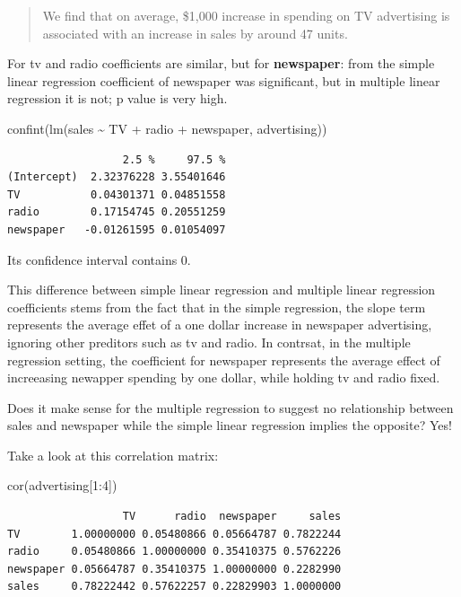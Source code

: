 \documentclass[
  letterpaper,
  DIV=11,
  numbers=noendperiod]{scrreprt}
\newenvironment{Shaded}{\begin{snugshade}}{\end{snugshade}}
\newcommand{\DecValTok}[1]{\textcolor[rgb]{0.68,0.00,0.00}{#1}}
\newcommand{\FunctionTok}[1]{\textcolor[rgb]{0.28,0.35,0.67}{#1}}
\newcommand{\NormalTok}[1]{\textcolor[rgb]{0.00,0.23,0.31}{#1}}
\newcommand{\SpecialCharTok}[1]{\textcolor[rgb]{0.37,0.37,0.37}{#1}}
\begin{document}
\begin{quote}
We find that on average, \$1,000 increase in spending on TV advertising
is associated with an increase in sales by around 47 units.
\end{quote}

For tv and radio coefficients are similar, but for \textbf{newspaper}:
from the simple linear regression coefficient of newspaper was
significant, but in multiple linear regression it is not; p value is
very high.

\begin{Shaded}
\begin{Highlighting}[]
\FunctionTok{confint}\NormalTok{(}\FunctionTok{lm}\NormalTok{(sales }\SpecialCharTok{\textasciitilde{}}\NormalTok{ TV }\SpecialCharTok{+}\NormalTok{ radio }\SpecialCharTok{+}\NormalTok{ newspaper, advertising))}
\end{Highlighting}
\end{Shaded}

\begin{verbatim}
                  2.5 %     97.5 %
(Intercept)  2.32376228 3.55401646
TV           0.04301371 0.04851558
radio        0.17154745 0.20551259
newspaper   -0.01261595 0.01054097
\end{verbatim}

Its confidence interval contains 0.

This difference between simple linear regression and multiple linear
regression coefficients stems from the fact that in the simple
regression, the slope term represents the average effet of a one dollar
increase in newspaper advertising, ignoring other preditors such as tv
and radio. In contrsat, in the multiple regression setting, the
coefficient for newspaper represents the average effect of increeasing
newapper spending by one dollar, while holding tv and radio fixed.

Does it make sense for the multiple regression to suggest no
relationship between sales and newspaper while the simple linear
regression implies the opposite? Yes!

Take a look at this correlation matrix:

\begin{Shaded}
\begin{Highlighting}[]
\FunctionTok{cor}\NormalTok{(advertising[}\DecValTok{1}\SpecialCharTok{:}\DecValTok{4}\NormalTok{])}
\end{Highlighting}
\end{Shaded}

\begin{verbatim}
                  TV      radio  newspaper     sales
TV        1.00000000 0.05480866 0.05664787 0.7822244
radio     0.05480866 1.00000000 0.35410375 0.5762226
newspaper 0.05664787 0.35410375 1.00000000 0.2282990
sales     0.78222442 0.57622257 0.22829903 1.0000000
\end{verbatim}
\end{document}
